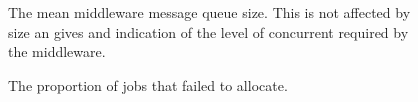 \begin{figure}[h] 
  \centering

  \caption{The mean middleware message queue size. This is not affected by size
  an gives and indication of the level of concurrent required by the
  middleware.}

  \label{FIG:RES:QSIZE}
\end{figure}

\begin{figure}[h] 
  \centering
  \caption{The proportion of jobs that failed to allocate.}
  \label{FIG:RES:PROPFAILED}
\end{figure}

